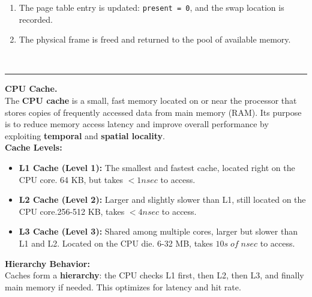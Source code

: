 \documentclass[8pt]{extarticle}
\begin{document}
\begin{minipage}[htp]{0.5\textwidth}
\begin{minipage}[htp]{1\textwidth}
\begin{enumerate}[noitemsep,nolistsep,topsep=-5px,partopsep=0pt,parsep=0pt]
    \item The page table entry is updated: \texttt{present = 0}, and the swap location is recorded.
    \item The physical frame is freed and returned to the pool of available memory.
\end{enumerate}
\end{minipage}\\
\vspace{3px}
\hrule
\vspace{3px}
\begin{minipage}[htp]{1\textwidth}

    \noindent\textbf{CPU Cache.} \\
    The \textbf{CPU cache} is a small, fast memory located on or near the processor that stores copies of frequently accessed data from main memory (RAM). Its purpose is to reduce memory access latency and improve overall performance by exploiting \textbf{temporal} and \textbf{spatial locality}.\\
    \noindent\textbf{Cache Levels:}
    \begin{itemize}[noitemsep,topsep=0pt]
        \item \textbf{L1 Cache (Level 1):} The smallest and fastest cache, located right on the CPU core. 64 KB, but takes $< 1 nsec$ to access.
        \item \textbf{L2 Cache (Level 2):} Larger and slightly slower than L1, still located on the CPU core.256-512 KB, takes $< 4 nsec$ to access.
        \item \textbf{L3 Cache (Level 3):} Shared among multiple cores, larger but slower than L1 and L2. Located on the CPU die. 6-32 MB, takes $10s \;of \;nsec$ to access.  
    \end{itemize}
    \noindent\textbf{Hierarchy Behavior:} \\
    Caches form a \textbf{hierarchy}: the CPU checks L1 first, then L2, then L3, and finally main memory if needed. This optimizes for latency and hit rate.
    \end{minipage}
\end{minipage}
\hspace{5px}
\vline
\hspace{5px}
\end{document}
